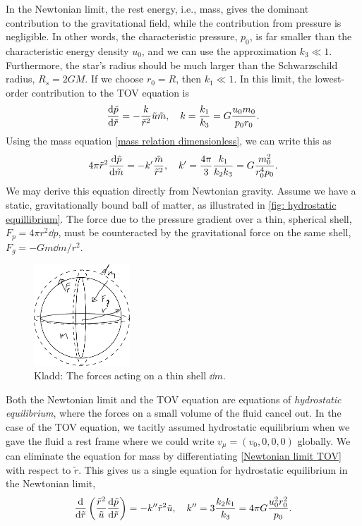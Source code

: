 In the Newtonian limit, the rest energy, i.e., mass, gives the dominant contribution to the gravitational field, while the contribution from pressure is negligible. 
In other words, the characteristic pressure, $p_0$, is far smaller than the characteristic energy density $u_0$, and we can use the approximation $k_3 \ll 1$.
Furthermore, the star's radius should be much larger than the Schwarzschild radius, $R_s = 2 G M$.
If we choose $r_0 = R$, then $ k_1 \ll 1$.
In this limit, the lowest-order contribution to the TOV equation is
%
\begin{equation}
    \label{Newtonian limit TOV}
    \odv{\tilde p}{\tilde r} = - \frac{k}{\tilde r^2}\tilde u \tilde m, \quad
    k = \frac{k_1}{k_3} =  G \frac{u_0 m_0}{p_0 r_0}.
\end{equation}
%
Using the mass equation \autoref{mass relation dimensionless}, we can write this as
%
\begin{equation}
    4 \pi \tilde r^2 \odv{\tilde p}{\tilde m}
    = - k' \frac{\tilde m}{\tilde r^2}, 
    \quad k' = \frac{4 \pi}{3} \frac{k_1}{k_2 k_3} = G \frac{m_0^2}{r_0^4 p_0}.
\end{equation}
%
We may derive this equation directly from Newtonian gravity.
Assume we have a static, gravitationally bound ball of matter, as illustrated in \autoref{fig: hydrostatic equillibrium}.
The force due to the pressure gradient over a thin, spherical shell, $F_p = 4 \pi r^2 \dd p$, must be counteracted by the gravitational force on the same shell, $F_g = - G m \dd m / r^2$.

\begin{figure}[h]
    \centering
    \includegraphics[width=0.32\textwidth]{figurer/hydrostatic_equillibrium.pdf}
    \caption{Kladd: The forces acting on a thin shell $\dd m$.}
    \label{fig: hydrostatic equillibrium}
\end{figure}

Both the Newtonian limit and the TOV equation are equations of \emph{hydrostatic equilibrium}, where the forces on a small volume of the fluid cancel out.
In the case of the TOV equation, we tacitly assumed hydrostatic equilibrium when we gave the fluid a rest frame where we could write $v_\mu = (v_0, 0, 0, 0)$ globally.
We can eliminate the equation for mass by differentiating \autoref{Newtonian limit TOV} with respect to $\tilde r$.
This gives us a single equation for hydrostatic equilibrium in the Newtonian limit,
%
\begin{equation}
    \odv{}{\tilde r} 
    \left( \frac{\tilde r^2}{\tilde u} \odv{\tilde p}{\tilde r}\right) 
    = -  k'' \tilde r^2  \tilde u, \quad
    k'' = 3 \frac{k_2 k_1}{k_3} = 4 \pi G \frac{u_0^2 r^2_0}{p_0}.
\end{equation}



